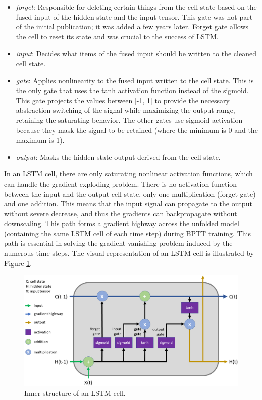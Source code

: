 \begin{itemize}
\item \textit{forget}: Responsible for deleting certain things from the cell state based on the fused input of the hidden state and the input tensor. This gate was not part of the initial publication; it was added a few years later\cite{LSTM-ForgetGate}. Forget gate allows the cell to reset its state and was crucial to the success of LSTM.
\item \textit{input}: Decides what items of the fused input should be written to the cleaned cell state.
\item \textit{gate}: Applies nonlinearity to the fused input written to the cell state. This is the only gate that uses the tanh activation function instead of the sigmoid. This gate projects the values between [-1, 1] to provide the necessary abstraction switching of the signal while maximizing the output range, retaining the saturating behavior. The other gates use sigmoid activation because they mask the signal to be retained (where the minimum is 0 and the maximum is 1).
\item \textit{output}: Masks the hidden state output derived from the cell state.
\end{itemize}

In an LSTM cell, there are only saturating nonlinear activation functions, which can handle the gradient exploding problem. There is no activation function between the input and the output cell state, only one multiplication (forget gate) and one addition. This means that the input signal can propagate to the output without severe decrease, and thus the gradients can backpropagate without downscaling. This path forms a gradient highway across the unfolded model (containing the same LSTM cell of each time step) during BPTT training. This path is essential in solving the gradient vanishing problem induced by the numerous time steps. The visual representation of an LSTM cell is illustrated by Figure \ref{fig:LSTM}.

\begin{figure}[htb]
 \centerline{\includegraphics[width=1.0\columnwidth]{.//Figure/Sequential/LSTM.png}}
 \caption{Inner structure of an LSTM cell.}
 \label{fig:LSTM}
\end{figure}

